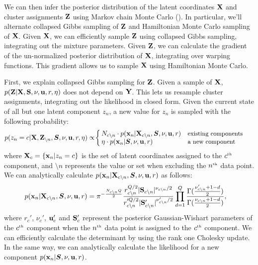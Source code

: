 We can then infer the posterior distribution of the latent coordinates $\mathbf{X}$ and cluster assignments $\mathbf{Z}$ using Markov chain Monte Carlo (\mcmc{}).
In particular, we'll alternate collapsed Gibbs sampling of $\mathbf{Z}$ and Hamiltonian Monte Carlo sampling of $\mathbf{X}$.
Given $\mathbf{X}$,
we can efficiently sample $\mathbf{Z}$ using collapsed Gibbs sampling, integrating out the mixture parameters.
Given $\mathbf{Z}$, we can calculate the gradient of the un-normalized posterior distribution of $\mathbf{X}$, integrating over warping functions.
This gradient allows us to sample $\mathbf{X}$ using Hamiltonian Monte Carlo.

First, we explain collapsed Gibbs sampling for $\mathbf{Z}$.
Given a sample of $\mathbf{X}$, $p(\mathbf{Z} | \mathbf{X}, \mathbf{S}, \nu, {\bf{u}}, r, \eta)$ does not depend on $\mathbf{Y}$.
This lets us resample cluster assignments, integrating out the \iGMM{} likelihood in closed form.
Given the current state of all but one latent component $z_n$, a new value for $z_n$ is sampled with the following probability:
%
\begin{align}
p(z_{n}=c|\mathbf{X},\mathbf{Z}_{\setminus n},\bm{S},\nu,{\bf{u}},r,\eta)
 & \propto\!
\left\{
\begin{array}{ll}
\!\!N_{c\setminus n}\cdot p({\bf{x}}_{n}|\mathbf{X}_{c\setminus n},\bm{S},\nu,{\bf{u}},r) & \text{{\small existing components}}\\
\!\!\eta\cdot p({\bf{x}}_{n}|\bm{S},\nu,{\bf{u}},r) & \text{{\small a new component}}
\end{array}
\right.
\label{eq:gibbs}
\end{align}
%
where $\mathbf{X}_{c}=\{{\bf{x}}_{n}|z_{n}=c\}$ 
is the set of latent coordinates assigned to the $c^{\text{\tiny th}}$ component,
and $\setminus n$ represents the value or set
when excluding the $n^{\text{\tiny th}}$ data point.
We can analytically calculate $p({\bf{x}}_{n}|\mathbf{X}_{c\setminus n},\bm{S},\nu,{\bf{u}},r)$
as follows:
%
\begin{align}
p({\bf{x}}_{n}|\mathbf{X}_{c\setminus n},\bm{S},\nu,{\bf{u}},r)
 & =\pi^{-\frac{N_{c\setminus n}Q}{2}}\frac{r_{c\setminus n}^{Q/2}|\mathbf{S}_{c\setminus n}|^{\nu_{c\setminus n}/2}}{r_{c\setminus n}'^{Q/2}|\mathbf{S}_{c\setminus n}'|^{\nu_{c\setminus n}'/2}}\prod_{d=1}^{Q}\frac{\Gamma(\frac{\nu_{c\setminus n}'+1-d}{2})}{\Gamma(\frac{\nu_{c\setminus n}+1-d}{2})},
\end{align}
%
where $r_{c}'$, $\nu_{c}'$, ${\bf{u}}_{c}'$ and $\mathbf{S}_{c}'$ represent the posterior Gaussian-Wishart parameters of the $c^{\text{\tiny th}}$ component when the $n^{\text{\tiny th}}$ data point is assigned to the $c^{\text{\tiny th}}$ component.
We can efficiently calculate the determinant by using the rank one Cholesky update.
In the same way, we can analytically calculate the likelihood for a new component $p({\bf{x}}_{n}|\bm{S},\nu,{\bf{u}},r)$.


